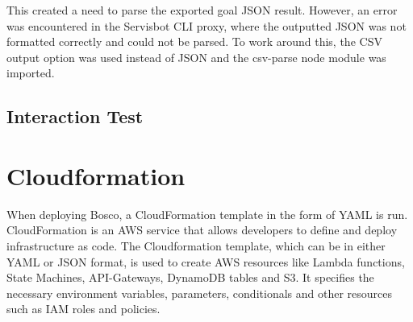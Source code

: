 \documentclass[12pt,a4paper,titlepage]{report}
\begin{document}
This created a need to parse the exported goal JSON result. However, an error was encountered in the Servisbot CLI proxy, where the outputted JSON was not formatted correctly and could not be parsed. 
To work around this, the CSV output option was used instead of JSON and the csv-parse node module was imported.

\subsection{Interaction Test}

\section{Cloudformation}
When deploying Bosco, a  CloudFormation template in the form of YAML is run.  CloudFormation is an AWS service that allows developers to define and deploy infrastructure as code.
The Cloudformation template, which can be in either YAML or JSON format, is used to create AWS resources like Lambda functions, State Machines, API-Gateways, DynamoDB tables and S3. 
It specifies the necessary environment variables, parameters, conditionals and other resources such as IAM roles and policies.
\end{document}
